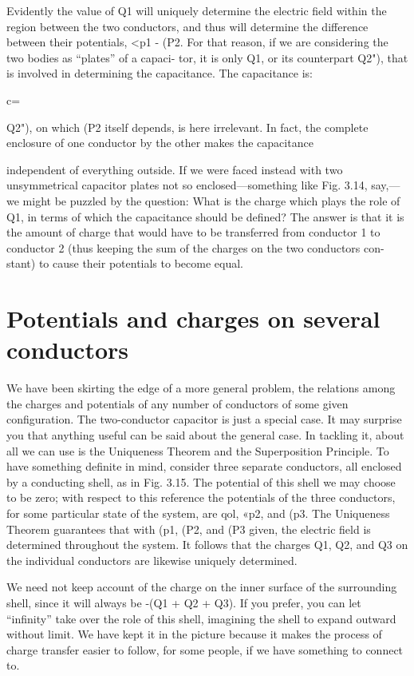 Evidently the value of Q1 will uniquely determine the electric field
within the region between the two conductors, and thus will determine
the difference between their potentials, <p1 - (P2. For that
reason, if we are considering the two bodies as ``plates'' of a capaci-
tor, it is only Q1, or its counterpart Q2"), that is involved in determining
the capacitance. The capacitance is:

c=%

Q2"), on which (P2 itself depends, is here irrelevant. In fact, the complete
enclosure of one conductor by the other makes the capacitance

independent of everything outside. If we were faced instead with
two unsymmetrical capacitor plates not so enclosed---something like
Fig. 3.14, say,---we might be puzzled by the question: What is the
charge which plays the role of Q1, in terms of which the capacitance
should be defined? The answer is that it is the amount of charge
that would have to be transferred from conductor 1 to conductor 2
(thus keeping the sum of the charges on the two conductors con-
stant) to cause their potentials to become equal.

\section{Potentials and charges on several conductors}

We have been skirting the edge of a more general problem, the
relations among the charges and potentials of any number of conductors
of some given configuration. The two-conductor capacitor
is just a special case. It may surprise you that anything useful can
be said about the general case. In tackling it, about all we can use
is the Uniqueness Theorem and the Superposition Principle. To
have something definite in mind, consider three separate conductors,
all enclosed by a conducting shell, as in Fig. 3.15. The potential of
this shell we may choose to be zero; with respect to this reference the
potentials of the three conductors, for some particular state of the
system, are qol, «p2, and (p3. The Uniqueness Theorem guarantees
that with (p1, (P2, and (P3 given, the electric field is determined throughout
the system. It follows that the charges Q1, Q2, and Q3 on the
individual conductors are likewise uniquely determined.

We need not keep account of the charge on the inner surface of
the surrounding shell, since it will always be -(Q1 + Q2 + Q3).
If you prefer, you can let ``infinity'' take over the role of this shell,
imagining the shell to expand outward without limit. We have kept
it in the picture because it makes the process of charge transfer easier
to follow, for some people, if we have something to connect to.

